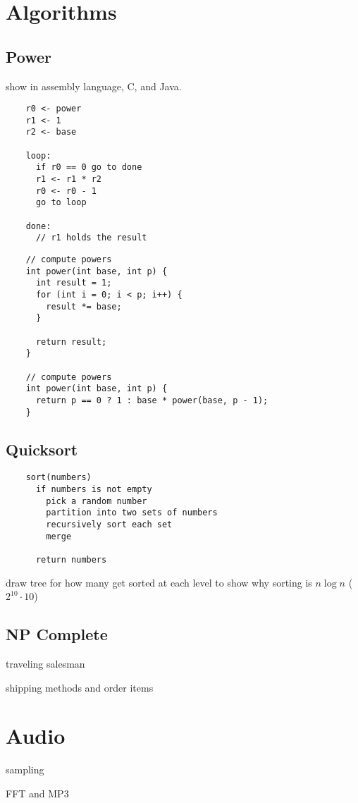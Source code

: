 \documentclass[landscape]{exam}
\begin{document}
  \section{Algorithms}

  \subsection{Power}

  show in assembly language, C, and Java.

  \begin{verbatim}
    r0 <- power
    r1 <- 1
    r2 <- base
    
    loop: 
      if r0 == 0 go to done
      r1 <- r1 * r2
      r0 <- r0 - 1
      go to loop

    done:
      // r1 holds the result
  \end{verbatim}

  \begin{verbatim}
    // compute powers
    int power(int base, int p) {
      int result = 1;
      for (int i = 0; i < p; i++) {
        result *= base;
      }

      return result;
    }

    // compute powers
    int power(int base, int p) {
      return p == 0 ? 1 : base * power(base, p - 1);
    }

  \end{verbatim}

  \subsection{Quicksort}

  \begin{verbatim}
    sort(numbers)
      if numbers is not empty
        pick a random number
        partition into two sets of numbers
        recursively sort each set
        merge

      return numbers
  \end{verbatim}

  draw tree for how many get sorted at each level to show why sorting is $n \log n$ ($2^{10} \cdot 10$)

  \subsection{NP Complete}
  \begin{itemize*}
    \item traveling salesman
    \item shipping methods and order items
  \end{itemize*}

  \section{Audio}
  \begin{itemize*}
    \item sampling
    \item FFT and MP3
  \end{itemize*}
\end{document}

